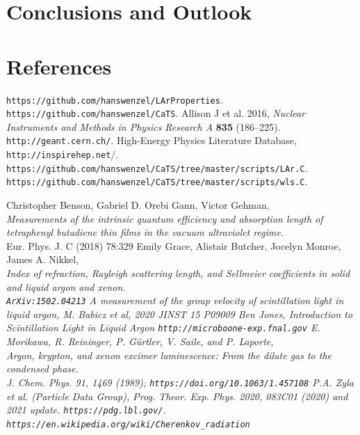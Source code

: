 \documentclass[a4paper]{jpconf}
\begin{document}
\section{Conclusions and Outlook}
\clearpage
 \section*{References}

 \begin{thebibliography}{99}
   \verb|https://github.com/hanswenzel/LArProperties|.
   \verb|https://github.com/hanswenzel/CaTS|.
 Allison J et al. 2016, {\it Nuclear Instruments and Methods in Physics
                Research A} {\bf 835} (186--225).
 \verb|http://geant.cern.ch/|.
 High-Energy Physics Literature Database,
  \verb"http://inspirehep.net"/.
  \verb|https://github.com/hanswenzel/CaTS/tree/master/scripts/LAr.C|.\\
  \verb|https://github.com/hanswenzel/CaTS/tree/master/scripts/wls.C|.

 Christopher Benson, Gabriel D. Orebi Gann, Victor Gehman,\\
  {\it Measurements of the intrinsic quantum efficiency and absorption
      length of tetraphenyl butadiene thin films in the vacuum
      ultraviolet regime.}\\
Eur. Phys. J. C (2018) 78:329
Emily Grace, Alistair Butcher, Jocelyn Monroe, James A. Nikkel,\\
  \it{Index of refraction, Rayleigh scattering length, and Sellmeier coefficients in solid and liquid argon and xenon.}\\
  \verb|ArXiv:1502.04213|
  \it{A measurement of the group velocity of scintillation light in liquid argon},
  M. Babicz et al, 2020 JINST 15 P09009
  Ben Jones, \it{Introduction to Scintillation Light in Liquid Argon}
  \verb|http://microboone-exp.fnal.gov|
  E. Morikawa, R. Reininger, P. Gürtler, V. Saile, and P. Laporte,\\
\it{Argon, krypton, and xenon excimer luminescence: From the dilute gas to the
condensed phase.}\\
J. Chem. Phys. 91, 1469 (1989);
  \verb|https://doi.org/10.1063/1.457108|
P.A. Zyla et al. (Particle Data Group), Prog. Theor. Exp. Phys. 2020, 083C01 (2020) and 2021 update.
\verb|https://pdg.lbl.gov/|.
\verb|https://en.wikipedia.org/wiki/Cherenkov_radiation|
\end{thebibliography}
\end{document}
